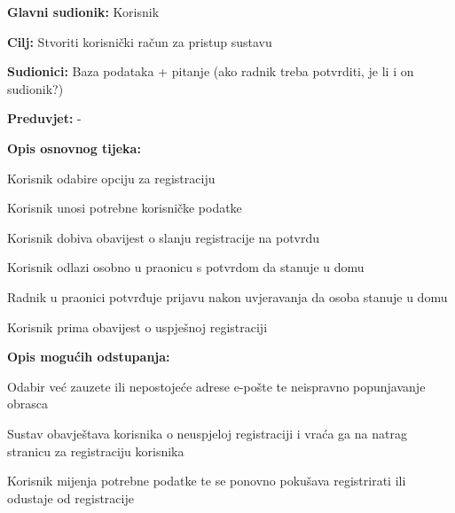 				\noindent {}
				\begin{packed_item}
					
					\item \textbf{Glavni sudionik: } Korisnik
					\item  \textbf{Cilj:} Stvoriti korisnički račun za pristup sustavu
					\item  \textbf{Sudionici:}  Baza podataka + pitanje (ako radnik treba potvrditi, je li i on sudionik?)
					\item  \textbf{Preduvjet:} -
					\item  \textbf{Opis osnovnog tijeka:}
					
					\item[] \begin{packed_enum}
						
						\item Korisnik odabire opciju za registraciju
						\item Korisnik unosi potrebne korisničke podatke
						\item Korisnik dobiva obavijest o slanju registracije na potvrdu
						\item Korisnik odlazi osobno u praonicu s potvrdom da stanuje u domu 
						\item Radnik u praonici potvrđuje prijavu nakon uvjeravanja da osoba stanuje u domu
						\item Korisnik prima obavijest o uspješnoj registraciji
					\end{packed_enum}
					
					\item  \textbf{Opis mogućih odstupanja:}
					
					\item[] \begin{packed_item}
						
						\item[2.a] Odabir već zauzete ili nepostojeće adrese e-pošte te neispravno popunjavanje obrasca
						\item[] \begin{packed_enum}
							
							\item Sustav obavještava korisnika o neuspjeloj registraciji i vraća ga na natrag stranicu za registraciju korisnika
							\item Korisnik mijenja potrebne podatke te se ponovno pokušava registrirati ili odustaje od registracije
							
						\end{packed_enum}
					

\end{packed_item}
\end{packed_item}
